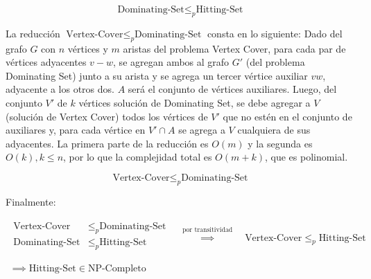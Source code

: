 \[\text{Dominating-Set}  \leq _{p} \text{Hitting-Set}\]


La reducción $\text{Vertex-Cover} \leq _{p} \text{Dominating-Set}$ consta en lo siguiente:
Dado del grafo $G$ con $n$ vértices y $m$ aristas del problema Vertex Cover, para cada par de vértices adyacentes $v-w$, se agregan ambos al grafo $G'$ (del problema Dominating Set) junto a su arista y se agrega un tercer vértice auxiliar $vw$, adyacente a los otros dos. $A$ será el conjunto de vértices auxiliares. Luego, del conjunto $V'$ de $k$ vértices solución de Dominating Set, se debe agregar a $V$ (solución de Vertex Cover) todos los vértices de $V'$ que no estén en el conjunto de auxiliares y, para cada vértice en $V' \cap A$ se agrega a $V$ cualquiera de sus adyacentes. La primera parte de la reducción es $O(m)$ y la segunda es $O(k),k \leq n$, por lo que la complejidad total es $O(m+k)$, que es polinomial.

\[\text{Vertex-Cover} \leq _{p} \text{Dominating-Set}\]


Finalmente:

\[
    \begin{array}{c}
        \begin{split}
            \text{Vertex-Cover}  & \leq _{p} \text{Dominating-Set} \\
            \text{Dominating-Set}  & \leq _{p} \text{Hitting-Set} \\
        \end{split}
        \quad \overset{ \text{por transitividad} }{ \implies  } \quad
        \text{Vertex-Cover}  \leq _{p} \text{Hitting-Set} \\ \\
        \implies \text{Hitting-Set} \in \text{NP-Completo}    
    \end{array}
\]
